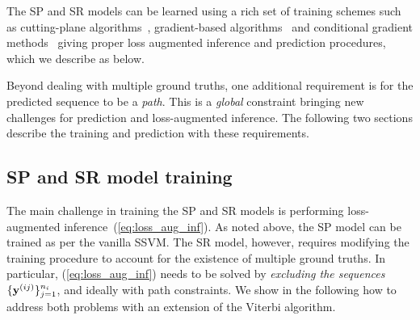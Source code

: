 
The SP and SR models can be learned using a rich set of training schemes such as
cutting-plane algorithms~\cite{joachims2009predicting}, %
gradient-based algorithms~\cite{ratliff2006subgradient} %
and conditional gradient methods~\cite{lacoste2013block} %
giving proper loss augmented inference and prediction procedures,
which we describe as below. %

Beyond dealing with multiple ground truths,
one additional requirement is for the predicted sequence to be a {\em path}.
This is a {\em global} constraint bringing new challenges for prediction and loss-augmented inference.
The following two sections describe the training and prediction with these requirements.

\subsection{SP and SR model training}
\label{ssec:training}

The main challenge in training the SP and SR models is performing loss-augmented inference~(\ref{eq:loss_aug_inf}).
As noted above, the SP model can be trained as per the vanilla SSVM.
The SR model, however, requires modifying the training procedure to account for the existence of multiple ground truths.
In particular, (\ref{eq:loss_aug_inf}) needs to be solved by \emph{excluding the sequences} $\{\mathbf{y}^{({ij})}\}_{j=1}^{n_i}$, and ideally with {\sc path} constraints.
We show in the following how to address both problems with an extension of the Viterbi algorithm.

